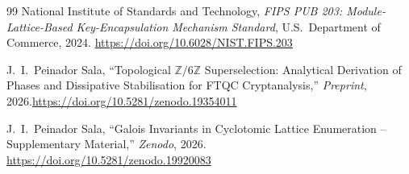 \documentclass[12pt,a4paper]{article}
\begin{document}
\begin{thebibliography}{99}
National Institute of Standards and Technology, \emph{FIPS PUB 203: Module-Lattice-Based Key-Encapsulation Mechanism Standard}, U.S.\ Department of Commerce, 2024. \url{https://doi.org/10.6028/NIST.FIPS.203}

J.\ I.\ Peinador Sala, ``Topological $\mathbb{Z}/6\mathbb{Z}$ Superselection: Analytical Derivation of Phases and Dissipative Stabilisation for FTQC Cryptanalysis,'' \emph{Preprint}, 2026.\url{https://doi.org/10.5281/zenodo.19354011}

J.\ I.\ Peinador Sala, ``Galois Invariants in Cyclotomic Lattice Enumeration -- Supplementary Material,'' \emph{Zenodo}, 2026. \url{https://doi.org/10.5281/zenodo.19920083}
\end{thebibliography}
\end{document}
